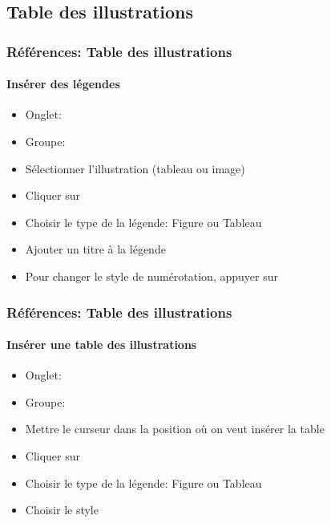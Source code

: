 \documentclass[xcolor=table]{beamer}
\begin{document}
\subsection{Table des illustrations}

\begin{frame}[t]
\frametitle{Références: Table des illustrations}
\framesubtitle{Insérer des légendes}

\begin{minipage}{0.61\textwidth}
	\begin{itemize}
		\item Onglet: 
		\item Groupe: 
		\item Sélectionner l'illustration (tableau ou image)
		\item Cliquer sur 
		\item Choisir le type de la légende: Figure ou Tableau
		\item Ajouter un titre à la légende
		\item Pour changer le style de numérotation, appuyer sur 
	\end{itemize}
\end{minipage}
\begin{minipage}{0.38\textwidth}
	
	
\end{minipage}

\end{frame}

\begin{frame}[t]
\frametitle{Références: Table des illustrations}
\framesubtitle{Insérer une table des illustrations}

\begin{minipage}{0.61\textwidth}
	\begin{itemize}
		\item Onglet: 
		\item Groupe: 
		\item Mettre le curseur dans la position où on veut insérer la table
		\item Cliquer sur 
		\item Choisir le type de la légende: Figure ou Tableau
		\item Choisir le style
	\end{itemize}
\end{minipage}
\begin{minipage}{0.38\textwidth}
	
	
\end{minipage}

\end{frame}
\end{document}
